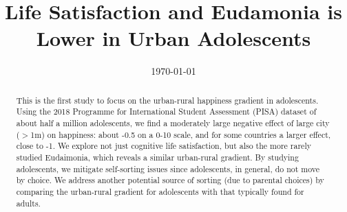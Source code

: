 \documentclass[10pt, letterpaper]{article}
\date{{}\today \hspace{.2in}\xxivtime}
\title{  %
Life Satisfaction and Eudamonia is Lower in Urban Adolescents
}
\author{
}
\begin{document}


\maketitle
\vspace{-.4in}
\begin{center}

\end{center}


\begin{abstract}
  \noindent This is the first study to focus on the urban-rural happiness gradient
  in adolescents. Using the 2018 Programme for International Student Assessment
  (PISA) dataset of about half a million adolescents, we  find a moderately large negative effect of large city ($>$1m) on
  happiness: about -0.5 on a 0-10 scale, and for some countries a larger effect, close to -1.   %
  We explore not just cognitive life satisfaction, but also the more rarely studied
  Eudaimonia, which reveals a similar urban-rural gradient. By studying
  adolescents, we mitigate self-sorting issues since adolescents, in general, do
  not move by choice. 
  We address another potential source of sorting (due to parental choices) by
  comparing the urban-rural gradient for adolescents with that typically found
  for adults.
\end{abstract}
\vspace{.15in} 
\vspace{.25in} 
\end{document}
